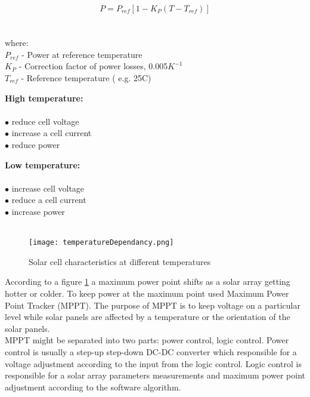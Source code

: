 \begin{equation}
P = P_{ref} [ 1 - K_{P} ( T - T_{ref}) ]
\end{equation}
	\\
	\\
where:\\
     $P_{ref}$ - Power at reference temperature\\
     $K_{P}$ - Correction factor of power losses, 0.005$K^{-1}$\\
     $T_{ref}$ - Reference temperature ( e.g. 25\textdegree{}C)\\
     
     

\begin{multicols}{2}
	\textbf{High  temperature:} \\ \\
	$\bullet$ reduce cell voltage \\
	$\bullet$ increase a cell current\\
	$\bullet$ reduce power\\
	

	\columnbreak
	
	\textbf{Low temperature:}\\ \\
	$\bullet$ increase cell voltage\\
	$\bullet$ reduce a cell current\\
	$\bullet$ increase power\\
	\\
\end{multicols}


	\begin{figure}[h]
		\centering
		\texttt{[image: temperatureDependancy.png]}
		\caption{ Solar cell characteristics at different temperatures\cite{6} }
		\label{fig: EPS11}
	\end{figure}
	
According to a figure \ref{fig: EPS11} a maximum power point shifts as a solar array getting hotter or colder. To keep power at the maximum point used Maximum Power Point Tracker (MPPT). The purpose of MPPT is to keep voltage on a particular level while solar panels are affected by a temperature or the orientation of the solar panels.\\
\cite{20} MPPT might be separated into two parts: power control, logic control. Power control is usually a step-up step-down DC-DC  converter which responsible for a voltage adjustment according to the input from the logic control. Logic control is responsible for a solar array parameters measurements and maximum power point adjustment according to the software algorithm.\\  

